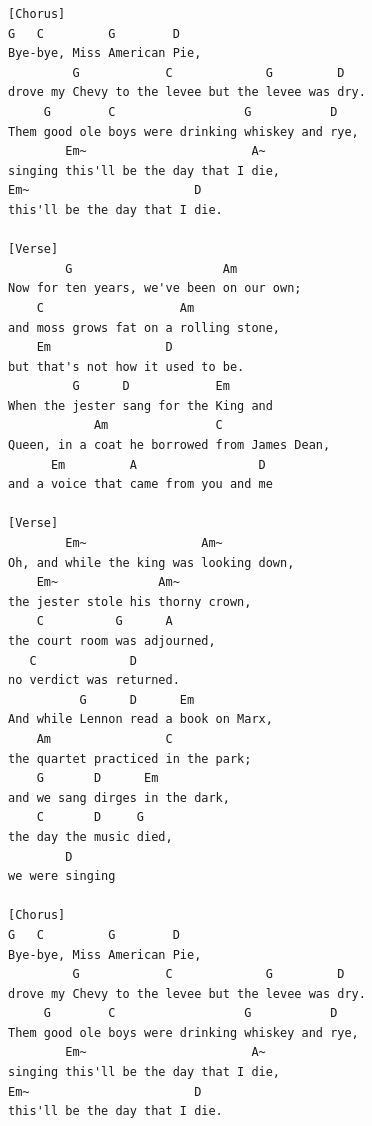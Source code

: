 \documentclass[../../../../songbookMain]{subfiles}
\begin{document}
\begin{verbatim}
[Chorus]
G   C         G        D
Bye-bye, Miss American Pie,
         G            C             G         D
drove my Chevy to the levee but the levee was dry.
     G        C                  G           D
Them good ole boys were drinking whiskey and rye,
        Em~                       A~
singing this'll be the day that I die,
Em~                       D
this'll be the day that I die.
 
[Verse]
        G                     Am
Now for ten years, we've been on our own;
    C                   Am
and moss grows fat on a rolling stone,
    Em                D
but that's not how it used to be.
         G      D            Em
When the jester sang for the King and
            Am               C
Queen, in a coat he borrowed from James Dean,
      Em         A                 D
and a voice that came from you and me
 
[Verse]
        Em~                Am~
Oh, and while the king was looking down,
    Em~              Am~
the jester stole his thorny crown,
    C          G      A
the court room was adjourned,
   C             D
no verdict was returned.
          G      D      Em
And while Lennon read a book on Marx,
    Am                C
the quartet practiced in the park;
    G       D      Em
and we sang dirges in the dark,
    C       D     G
the day the music died,
        D
we were singing
 
[Chorus]
G   C         G        D
Bye-bye, Miss American Pie,
         G            C             G         D
drove my Chevy to the levee but the levee was dry.
     G        C                  G           D
Them good ole boys were drinking whiskey and rye,
        Em~                       A~
singing this'll be the day that I die,
Em~                       D
this'll be the day that I die.
\end{verbatim}
\end{document}
